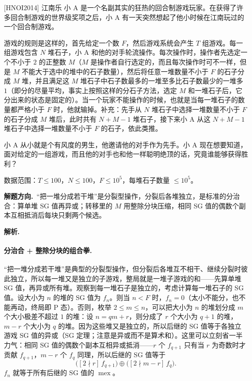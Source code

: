 \documentclass[UTF8,a4paper,11pt,oneside,openany,fontset=fandol]{ctexbook}
\theoremstyle{definition}
\newcommand{\mex}{\operatorname{mex}}
\newcommand{\iva}[1]{\left[#1\right]}
\newcommand{\sol}{\par\noindent\textbf{解析.}\ }
\newcommand{\hint}{\par\noindent\textbf{解题方向.}\ }
\begin{document}
\begin{problem}{[HNOI2014] 江南乐}
小 A 是一个名副其实的狂热的回合制游戏玩家。在获得了许多回合制游戏的世界级奖项之后，小 A 有一天突然想起了他小时候在江南玩过的一个回合制游戏。

游戏的规则是这样的，首先给定一个数 $F$，然后游戏系统会产生 $T$ 组游戏。每一组游戏包含 $N$ 堆石子，小 A 和他的对手轮流操作。每次操作时，操作者先选定一个不小于 $2$ 的正整数 $M$（$M$ 是操作者自行选定的，而且每次操作时可不一样，但是 $M$ 不能大于选中的堆中的石子数量），然后将任意一堆数量不小于 $F$ 的石子分成 $M$ 堆，并且满足这 $M$ 堆石子中石子数最多的一堆至多比石子数最少的一堆多 $1$（即分的尽量平均，事实上按照这样的分石子方法，选定 $M$ 和一堆石子后，它分出来的状态是固定的）。当一个玩家不能操作的时候，也就是当每一堆石子的数量都严格小于 $F$ 时，他就输掉。补充：先手从 $N$ 堆石子中选择一堆数量不小于 $F$ 的石子分成 $M$ 堆后，此时共有 $N+M-1$ 堆石子，接下来小 A 从这 $N+M-1$ 堆石子中选择一堆数量不小于 $F$ 的石子，依此类推。

小 A 从小就是个有风度的男生，他邀请他的对手作为先手。小 A 现在想要知道，面对给定的一组游戏，而且他的对手也和他一样聪明绝顶的话，究竟谁能够获得胜利？

数据范围：$T\le100$，$N\le100$，$F\le10^{5}$，每堆石子数量 $\le10^{5}$。
\end{problem}

\hint “把一堆分成若干堆”是分裂型操作，分裂后各堆独立，是标准的分治合：算单堆 SG 值再异或；转移里的 $M$ 用整除分块压缩，相同 SG 值的偶数个副本互相抵消后每块只剩两个候选。

\sol \paragraph{分治合 + 整除分块的组合拳.} “把一堆分成若干堆”是典型的分裂型操作，但分裂后各堆互不相干、继续分裂时彼此独立，所以每一堆又是独立的子游戏，整局就是一堆子游戏的和——先算单堆 SG 值，再异或所有堆。观察到每一堆石子是独立的，考虑计算每一堆石子的 SG 值。设大小为 $n$ 的堆的 SG 值为 $f_n$。则当 $n<F$ 时，$f_n=0$（太小不能分，也不能再动，终局即 P 态）。否则，枚举 $2\le m\le n$，可以把大小为 $n$ 的堆划分成 $m$ 个大小极差不超过 $1$ 的堆：设 $n=qm+r$，则分成了 $r$ 个大小为 $q+1$ 的堆，$m-r$ 个大小为 $q$ 的堆。因为这些堆又是独立的，所以后继的 SG 值等于各独立游戏 SG 值的异或（SG 定理；注意是异或而不是算术和）。这里可以立刻省一半力气：相同 SG 值的偶数个副本互相异或抵消——$r$ 个 $f_{q+1}$ 只有当 $r$ 为奇数时才贡献 $f_{q+1}$，$m-r$ 个 $f_q$ 同理，所以后继的 SG 值等于
\[
 \bigl(\iva{2\nmid r}\,f_{q+1}\bigr)\oplus\bigl(\iva{2\nmid m-r}\,f_q\bigr).
\]
$f_n$ 就等于所有后继的 SG 值的 $\mex$。
\end{document}
